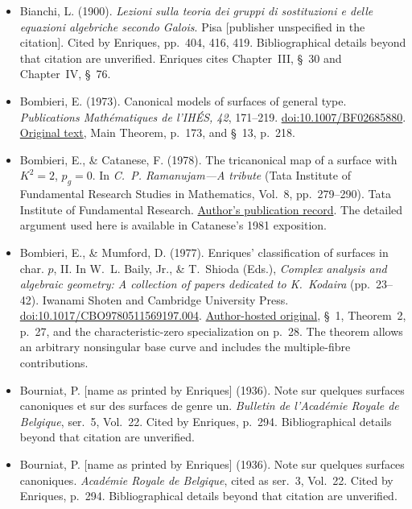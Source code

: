 \begin{sloppypar}
\begin{itemize}
\item Bianchi, L. (1900). \emph{Lezioni sulla teoria dei gruppi di sostituzioni e delle equazioni algebriche secondo Galois}. Pisa [publisher unspecified in the citation]. Cited by Enriques, pp.~404, 416, 419. Bibliographical details beyond that citation are unverified. Enriques cites Chapter~III, \S~30 and Chapter~IV, \S~76.

\item Bombieri, E. (1973). Canonical models of surfaces of general type. \emph{Publications Mathématiques de l'IHÉS, 42}, 171--219. \href{https://doi.org/10.1007/BF02685880}{doi:10.1007/BF02685880}. \href{https://www.numdam.org/article/PMIHES_1973__42__171_0.pdf}{Original text}, Main Theorem, p.~173, and \S~13, p.~218.

\item Bombieri, E., \& Catanese, F. (1978). The tricanonical map of a surface with $K^2=2$, $p_g=0$. In \emph{C.~P. Ramanujam---A tribute} (Tata Institute of Fundamental Research Studies in Mathematics, Vol.~8, pp.~279--290). Tata Institute of Fundamental Research. \href{https://www.mathe8.uni-bayreuth.de/en/team/prof-fabrizio-catanese/pdf/index.html}{Author's publication record}. The detailed argument used here is available in Catanese's 1981 exposition.

\item Bombieri, E., \& Mumford, D. (1977). Enriques' classification of surfaces in char. $p$, II. In W.~L. Baily, Jr., \& T.~Shioda (Eds.), \emph{Complex analysis and algebraic geometry: A collection of papers dedicated to K.~Kodaira} (pp.~23--42). Iwanami Shoten and Cambridge University Press. \href{https://doi.org/10.1017/CBO9780511569197.004}{doi:10.1017/CBO9780511569197.004}. \href{https://www.dam.brown.edu/people/mumford/alg_geom/papers/1976d--EnrClass-II-NC.pdf}{Author-hosted original}, \S~1, Theorem~2, p.~27, and the characteristic-zero specialization on p.~28. The theorem allows an arbitrary nonsingular base curve and includes the multiple-fibre contributions.

\item Bourniat, P. [name as printed by Enriques] (1936). Note sur quelques surfaces canoniques et sur des surfaces de genre un. \emph{Bulletin de l'Académie Royale de Belgique}, ser.~5, Vol.~22. Cited by Enriques, p.~294. Bibliographical details beyond that citation are unverified.

\item Bourniat, P. [name as printed by Enriques] (1936). Note sur quelques surfaces canoniques. \emph{Académie Royale de Belgique}, cited as ser.~3, Vol.~22. Cited by Enriques, p.~294. Bibliographical details beyond that citation are unverified.


\end{itemize}
\end{sloppypar}
